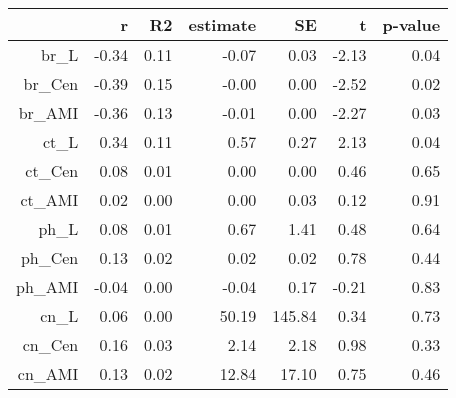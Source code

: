 \begin{table}[ht]
\centering
\begin{tabular}{rrrrrrr}
  \hline
 & r & R2 & estimate & SE & t & p-value \\ 
  \hline
br\_L & -0.34 & 0.11 & -0.07 & 0.03 & -2.13 & 0.04 \\ 
  br\_Cen & -0.39 & 0.15 & -0.00 & 0.00 & -2.52 & 0.02 \\ 
  br\_AMI & -0.36 & 0.13 & -0.01 & 0.00 & -2.27 & 0.03 \\ 
  ct\_L & 0.34 & 0.11 & 0.57 & 0.27 & 2.13 & 0.04 \\ 
  ct\_Cen & 0.08 & 0.01 & 0.00 & 0.00 & 0.46 & 0.65 \\ 
  ct\_AMI & 0.02 & 0.00 & 0.00 & 0.03 & 0.12 & 0.91 \\ 
  ph\_L & 0.08 & 0.01 & 0.67 & 1.41 & 0.48 & 0.64 \\ 
  ph\_Cen & 0.13 & 0.02 & 0.02 & 0.02 & 0.78 & 0.44 \\ 
  ph\_AMI & -0.04 & 0.00 & -0.04 & 0.17 & -0.21 & 0.83 \\ 
  cn\_L & 0.06 & 0.00 & 50.19 & 145.84 & 0.34 & 0.73 \\ 
  cn\_Cen & 0.16 & 0.03 & 2.14 & 2.18 & 0.98 & 0.33 \\ 
  cn\_AMI & 0.13 & 0.02 & 12.84 & 17.10 & 0.75 & 0.46 \\ 
   \hline
\end{tabular}
\end{table}
